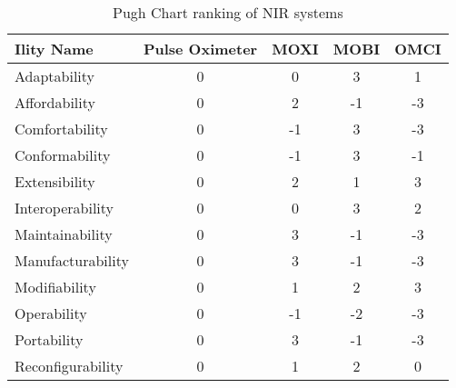 \begin{table}
\centering
\caption{Pugh Chart ranking of \ac{NIR} systems}
\label{tab:pughtable}
\begin{tabular}{@{}lcccc@{}}
\toprule
Ility Name        & Pulse Oximeter & MOXI & MOBI & OMCI \\ \midrule
Adaptability      & 0              & 0    & 3    & 1    \\
Affordability     & 0              & 2    & -1   & -3   \\
Comfortability    & 0              & -1   & 3    & -3   \\
Conformability    & 0              & -1   & 3    & -1   \\
Extensibility     & 0              & 2    & 1    & 3    \\
Interoperability  & 0              & 0    & 3    & 2    \\
Maintainability   & 0              & 3    & -1   & -3   \\
Manufacturability & 0              & 3    & -1   & -3   \\
Modifiability     & 0              & 1    & 2    & 3    \\
Operability       & 0              & -1   & -2   & -3   \\
Portability       & 0              & 3    & -1   & -3   \\
Reconfigurability & 0              & 1    & 2    & 0    \\ \bottomrule
\end{tabular}%
\end{table}

